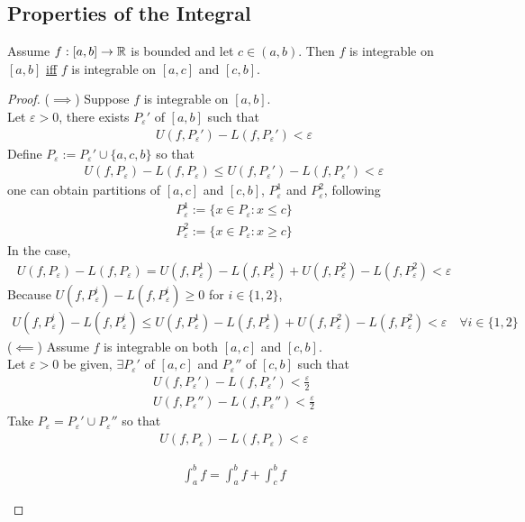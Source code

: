 \documentclass[11pt]{article}
\begin{document}
	\subsection{Properties of the Integral}
	\begin{theorem}
		Assume $f: [a, b] \to \mathbb{R}$ is bounded and let $c \in (a, b)$. Then $f$ is integrable on $[a, b]$ \ul{iff} $f$ is integrable on $[a, c]$ and $[c, b]$.
	\end{theorem}
	
	\begin{proof}
		($\implies$) Suppose $f$ is integrable on $[a, b]$. \\
		Let $\varepsilon > 0$, there exists $P_\varepsilon'$ of $[a, b]$ such that
		\begin{align}
			U(f, P_\varepsilon') - L(f, P_\varepsilon') < \varepsilon
		\end{align}
		Define $P_\varepsilon := P_\varepsilon' \cup \{a, c, b\}$ so that
		\begin{align}
			U(f, P_\varepsilon) - L(f, P_\varepsilon) 
			\leq U(f, P_\varepsilon') - L(f, P_\varepsilon')
			< \varepsilon
		\end{align}
		one can obtain partitions of $[a, c]$ and $[c, b]$, $P_\varepsilon^1$ and $P_\varepsilon^2$, following
		\begin{align}
			P_\varepsilon^1 := \{x \in P_\varepsilon: x \leq c\} \\
			P_\varepsilon^2 := \{x \in P_\varepsilon: x \geq c\}
		\end{align}
		In the case,
		\begin{align}
			U(f, P_\varepsilon) - L(f, P_\varepsilon)
			= U(f, P_\varepsilon^1) - L(f, P_\varepsilon^1) + U(f, P_\varepsilon^2) - L(f, P_\varepsilon^2)
			<\varepsilon
		\end{align}
		Because $U(f, P_\varepsilon^i) - L(f, P_\varepsilon^i) \geq 0$ for $i \in \{1, 2\}$,
		\begin{align}
			 U(f, P_\varepsilon^i) - L(f, P_\varepsilon^i)
			 \leq U(f, P_\varepsilon^1) - L(f, P_\varepsilon^1) + U(f, P_\varepsilon^2) - L(f, P_\varepsilon^2) < \varepsilon\quad  \forall i \in \{1, 2\}
		\end{align}
		($\impliedby$) Assume $f$ is integrable on both $[a, c]$ and $[c, b]$. \\
		Let $\varepsilon > 0$ be given, $\exists P_\varepsilon'$ of $[a, c]$ and $P_\varepsilon''$ of $[c, b]$ such that
		\begin{align}
			U(f, P_\varepsilon') - L(f, P_\varepsilon') < \frac{\varepsilon}{2} \\
			U(f, P_\varepsilon'') - L(f, P_\varepsilon'') < \frac{\varepsilon}{2}
		\end{align}
		Take $P_\varepsilon = P_\varepsilon' \cup P_\varepsilon''$ so that
		\begin{align}
			U(f, P_\varepsilon) - L(f, P_\varepsilon) < \varepsilon
		\end{align}
		\begin{lemma}
			\begin{align}
				\int_a^b f = \int_a^b f + \int_c^b f
			\end{align}
		\end{lemma}
		

\end{proof}
\end{document}
